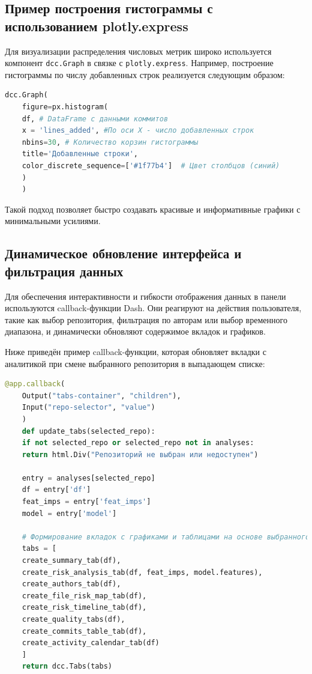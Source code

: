 \subsection{Пример построения гистограммы с использованием plotly.express}

Для визуализации распределения числовых метрик широко используется компонент \texttt{dcc.Graph} в связке с \texttt{plotly.express}. Например, построение гистограммы по числу добавленных строк реализуется следующим образом:

\begin{lstlisting}[language=Python, caption={Построение гистограммы добавленных строк}]
	dcc.Graph(
	figure=px.histogram(
	df, # DataFrame с данными коммитов
	x = 'lines_added', #По оси X - число добавленных строк
	nbins=30, # Количество корзин гистограммы
	title='Добавленные строки',
	color_discrete_sequence=['#1f77b4']  # Цвет столбцов (синий)
	)
	)
\end{lstlisting}

Такой подход позволяет быстро создавать красивые и информативные графики с минимальными усилиями.

\subsection{Динамическое обновление интерфейса и фильтрация данных}

Для обеспечения интерактивности и гибкости отображения данных в панели используются callback-функции Dash. Они реагируют на действия пользователя, такие как выбор репозитория, фильтрация по авторам или выбор временного диапазона, и динамически обновляют содержимое вкладок и графиков.

Ниже приведён пример callback-функции, которая обновляет вкладки с аналитикой при смене выбранного репозитория в выпадающем списке:

\begin{lstlisting}[language=Python, caption={Callback-функция обновления вкладок по выбранному репозиторию}]
	@app.callback(
	Output("tabs-container", "children"),
	Input("repo-selector", "value")
	)
	def update_tabs(selected_repo):
	if not selected_repo or selected_repo not in analyses:
	return html.Div("Репозиторий не выбран или недоступен")
	
	entry = analyses[selected_repo]
	df = entry['df']
	feat_imps = entry['feat_imps']
	model = entry['model']
	
	# Формирование вкладок с графиками и таблицами на основе выбранного репозитория
	tabs = [
	create_summary_tab(df),
	create_risk_analysis_tab(df, feat_imps, model.features),
	create_authors_tab(df),
	create_file_risk_map_tab(df),
	create_risk_timeline_tab(df),
	create_quality_tabs(df),
	create_commits_table_tab(df),
	create_activity_calendar_tab(df)
	]
	return dcc.Tabs(tabs)
\end{lstlisting}

